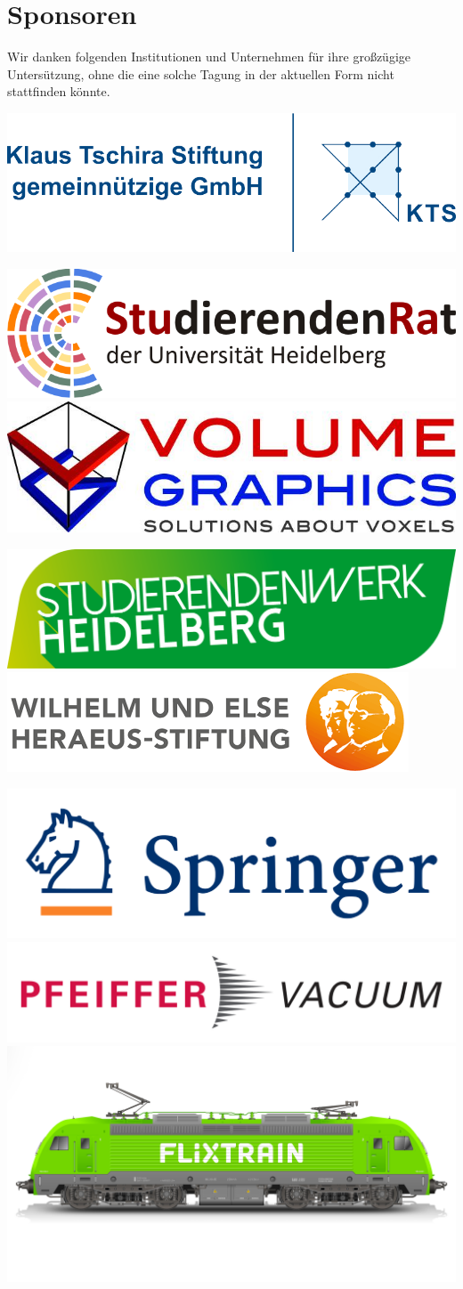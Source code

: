 
\pagebreak
\section{Sponsoren}
\small Wir danken folgenden Institutionen und Unternehmen für ihre großzügige Untersützung, ohne die eine solche Tagung in der aktuellen Form nicht stattfinden könnte.

\centering\includegraphics[width=.95\textwidth]{media/ktslogo}

\vspace{5mm}

\includegraphics[width=.47\textwidth]{media/StuRa}
\hfill
\includegraphics[width=.47\textwidth]{media/volumegraphics}

\vspace{7mm}

\includegraphics[width=.48\textwidth]{media/stuwe}
\hfill
\includegraphics[width=.48\textwidth]{media/heraeus}

\vspace{3mm}

\includegraphics[width=.31\textwidth]{media/springer}
\hfill
\includegraphics[width=.38\textwidth]{media/pfeiffer}
\hfill
\includegraphics[width=.27\textwidth]{media/flixtrain}


